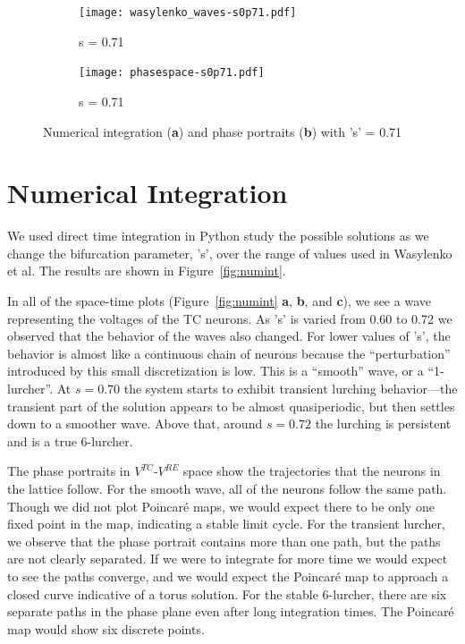 \documentclass[12pt,letterpaper,oneside,openany]{article}
\begin{document}
\begin{figure}[t]
        \begin{subfigure}[b]{0.5\textwidth}
                \centering
                \texttt{[image: wasylenko\_waves-s0p71.pdf]}
                \caption{s = 0.71}
                \label{fig:waves71}
        \end{subfigure}
        \begin{subfigure}[b]{0.4\textwidth}
                \centering
                \texttt{[image: phasespace-s0p71.pdf]}
                \caption{s = 0.71}
                \label{fig:phase71}
        \end{subfigure}
  \caption{Numerical integration ({\bf a}) and phase portraits ({\bf b}) with 's' = 0.71}
  \label{fig:quasiper}
\end{figure}

\section{Numerical Integration}


We used direct time integration in Python study the possible solutions as we change the bifurcation parameter, 's', over the range of values used in Wasylenko et al.\cite{Wasylenko2010} The results are shown in Figure~\ref{fig:numint}.

In all of the space-time plots (Figure~\ref{fig:numint} {\bf a}, {\bf b}, and {\bf c}), we see a wave representing the voltages of the TC neurons. As 's' is varied from 0.60 to 0.72 we observed that the behavior of the waves also changed. For lower values of 's', the behavior is almost like a continuous chain of neurons because the ``perturbation'' introduced by this small discretization is low. This is a ``smooth'' wave, or a ``1-lurcher''. At $s=0.70$ the system starts to exhibit transient lurching behavior---the transient part of the solution appears to be almost quasiperiodic, but then settles down to a smoother wave. Above that, around $s=0.72$ the lurching is persistent and is a true 6-lurcher.

The phase portraits in $V^{TC}$-$V^{RE}$ space show the trajectories that the neurons in the lattice follow. For the smooth wave, all of the neurons follow the same path. Though we did not plot Poincar\'{e} maps, we would expect there to be only one fixed point in the map, indicating a stable limit cycle. For the transient lurcher, we observe that the phase portrait contains more than one path, but the paths are not clearly separated. If we were to integrate for more time we would expect to see the paths converge, and we would expect the Poincar\'{e} map to approach a closed curve indicative of a torus solution. For the stable 6-lurcher, there are six separate paths in the phase plane even after long integration times. The Poincar\'{e} map would show six discrete points.
\end{document}
